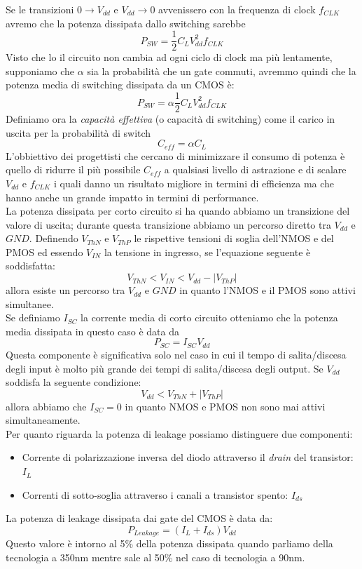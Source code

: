 Se le transizioni $0 \rightarrow V_{dd}$ e $V_{dd} \rightarrow 0$ avvenissero con la frequenza di clock $f_{CLK}$ avremo che la potenza dissipata dallo switching sarebbe
$$P_{SW} = \frac{1}{2}C_LV_{dd}^2 f_{CLK}$$
Visto che lo il circuito non cambia ad ogni ciclo di clock ma più lentamente, supponiamo che $\alpha$ sia la probabilità che un gate commuti, avremmo quindi che la potenza media di switching dissipata da un CMOS è:
$$P_{SW} = \alpha \frac{1}{2}C_LV_{dd}^2 f_{CLK}$$
Definiamo ora la \emph{capacità effettiva} (o capacità di switching) come il carico in uscita per la probabilità di switch
$$C_{eff} = \alpha C_L$$
L'obbiettivo dei progettisti che cercano di minimizzare il consumo di potenza è quello di ridurre il più possibile $C_{eff}$ a qualsiasi livello di astrazione  e di scalare  $V_{dd}$ e $f_{CLK}$ i quali danno un risultato migliore in termini di efficienza ma che hanno anche un grande impatto in termini di performance.\\
La potenza dissipata per corto circuito si ha quando abbiamo un transizione del valore di uscita; durante questa transizione abbiamo un percorso diretto tra $V_{dd}$ e $GND$.
Definendo $V_{ThN}$ e $V_{ThP}$ le rispettive tensioni di soglia dell'NMOS e del PMOS ed essendo $V_{IN}$ la tensione in ingresso, se l'equazione seguente è soddisfatta:
$$V_{ThN} < V_{IN} < V_{dd} - |V_{ThP}| $$
allora esiste un percorso tra $V_{dd}$ e $GND$ in quanto l'NMOS e il PMOS sono attivi simultanee.\\
Se definiamo $I_{SC}$ la corrente media di corto circuito otteniamo che la potenza media dissipata in questo caso è data da 
$$P_{SC} = I_{SC} V_{dd}$$
Questa componente è significativa solo nel caso in cui il tempo di salita/discesa degli input è molto più grande dei tempi di salita/discesa degli output. Se $V_{dd}$ soddisfa la seguente condizione:
$$V_{dd} < V_{ThN} + |V_{ThP}|$$
allora abbiamo che $I_{SC} = 0$ in quanto NMOS e PMOS non sono mai attivi simultaneamente.\\
Per quanto riguarda la potenza di leakage possiamo distinguere due componenti:
\begin{itemize}
\item Corrente di polarizzazione inversa del diodo attraverso il \emph{drain} del transistor: $I_L$
\item Correnti di sotto-soglia attraverso i canali a transistor spento: $I_{ds}$
\end{itemize}
La potenza di leakage dissipata dai gate del CMOS è data da:
$$P_{Leakage} = (I_L+ I_{ds}) V_{dd}$$
Questo valore è intorno al 5\% della potenza dissipata quando parliamo della tecnologia a 350nm mentre sale al 50\% nel caso di tecnologia a 90nm.\\
